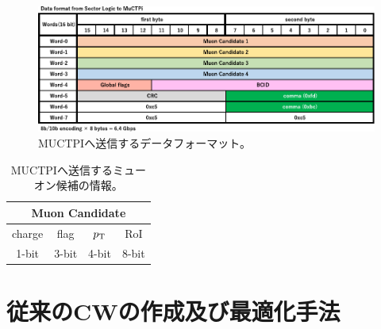 \begin{figure}[tb]
  \centering
  \includegraphics[clip, width=13cm]{fig/3/path879.pdf}
  \caption{MUCTPIへ送信するデータフォーマット\cite{article:okazaki-mron}。}
  \label{fig:MUCTPI_data}
\end{figure}

\begin{table}[]
    \caption{MUCTPIへ送信するミューオン候補の情報\cite{article:okazaki-mron}。}
    \label{Muon Candidate}
    \centering
    \begin{tabular}{|c|c|c|c|}
        \hline
        \multicolumn{4}{|c|}{Muon Candidate} \\ \hline\hline
        charge & flag & $p_{\rm{T}}$ & RoI\\ \hline
        1-bit & 3-bit & 4-bit & 8-bit \\ \hline
    \end{tabular}
\end{table}


\section{従来のCWの作成及び最適化手法}\label{section:最適化}
